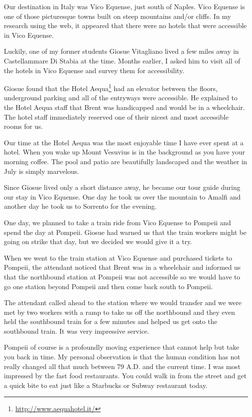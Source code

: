\documentclass[12pt]{book}
\begin{document}
Our destination in Italy was Vico Equense, just south
of Naples.   Vico Equense is one of those picturesque
towns built on steep mountains and\slash or cliffs.  In
my research using the web, it appeared that there
were no hotels that were accessible in Vico Equense.

Luckily, one of my former students Giosue Vitagliano
lived a few miles away
in Castellammare Di Stabia
at the time.  Months earlier, I asked him to
visit all of the hotels in Vico Equense and
survey them for accessibility.

Giosue found that the
Hotel Aequa\footnote{\url{http://www.aequahotel.it/}}
had an elevator
between the floors, underground parking and all
of the entryways were accessible.
He explained to the Hotel Aequa staff that
Brent was handicapped and would be in a wheelchair.  The
hotel staff immediately reserved one of their nicest
and most accessible rooms for us.

Our time at the Hotel Aequa was the most enjoyable
time I have ever spent at a hotel.  When you wake up
Mount Vesuvius is in the background as you have your
morning coffee.  The pool and patio are beautifully
landscaped and the weather in July is simply
marvelous.


Since Giosue lived only a short distance away, he became our
tour guide during our stay in Vico Equense.  One
day he took us over the mountain to Amalfi and
another day he took us to Sorrento for the evening.

One day, we planned to take a train ride from
Vico Equense to Pompeii and spend the day at
Pompeii.  Giosue had warned us that the train
workers might be going on strike that day, but
we decided we would give it a try.

When we went to the train station at Vico Equense
and purchased tickets to Pompeii, the attendant
noticed that Brent was in a wheelchair and informed
us that the northbound station at Pompeii
was not accessible so we would have to go one station
beyond Pompeii and then come back south to Pompeii.

The attendant called ahead to the station where we would
transfer and we were met by two workers with a ramp
to take us off the northbound and they even held
the southbound train for a few minutes and helped us get onto
the southbound train.  It was very impressive service.

Pompeii of course is a profoundly moving experience
that cannot help but take you back in time.  My
personal observation is that the human condition
has not really changed all that much between 79 A.D. and
the current time.  I was most impressed by
the fast food restaurants.  You could walk in from the
street and get a quick bite to eat just like a Starbucks
or Subway restaurant today.
\end{document}
